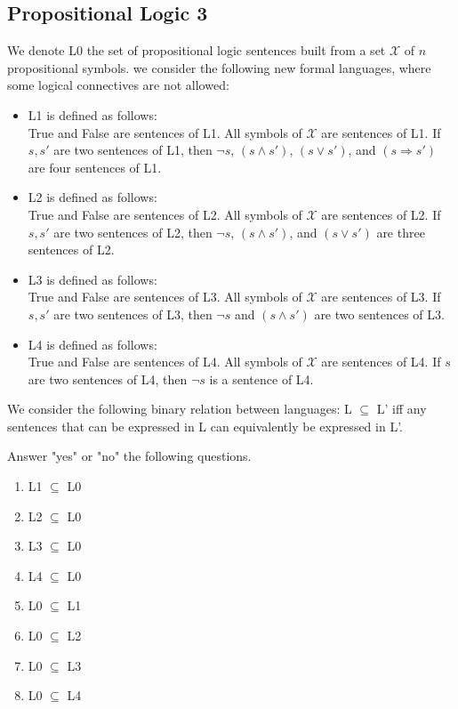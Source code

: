 \documentclass[11pt, answers]{exam}
\begin{document}
%
%
\begin{questions}
\section{Propositional Logic 3}
\question

We denote L0 the set of propositional logic sentences built from a set $\mathcal X$ of $n$ propositional symbols.
we consider the following new formal languages, where some logical connectives are not allowed:
\begin{itemize}
	\item L1 is defined as follows:\\
	True and False are sentences of L1.
	All symbols of $\mathcal X$ are sentences of L1.
	If $s, s'$ are two sentences of L1, then $\neg s$, $(s \wedge s')$, $(s \vee s')$, and $(s \Rightarrow s')$ are four sentences of L1.
	\item L2 is defined as follows:\\
	True and False are sentences of L2.
	All symbols of $\mathcal X$ are sentences of L2.
	If $s, s'$ are two sentences of L2, then $\neg s$, $(s \wedge s')$, and $(s \vee s')$ are three sentences of L2.
	\item L3 is defined as follows:\\
	True and False are sentences of L3.
	All symbols of $\mathcal X$ are sentences of L3.
	If $s, s'$ are two sentences of L3, then $\neg s$ and $(s \wedge s')$ are two sentences of L3.
	\item L4 is defined as follows:\\
	True and False are sentences of L4.
	All symbols of $\mathcal X$ are sentences of L4.
	If $s$ are two sentences of L4, then $\neg s$ is a sentence of L4.
\end{itemize}
We consider the following binary relation between languages: L $\subseteq$ L' iff any sentences that can be expressed in L can equivalently be expressed in L'.

Answer "yes" or "no" the following questions.

\begin{enumerate}
\item L1 $\subseteq$ L0
\item L2 $\subseteq$ L0
\item L3 $\subseteq$ L0
\item L4 $\subseteq$ L0
\item L0 $\subseteq$ L1
\item L0 $\subseteq$ L2
\item L0 $\subseteq$ L3
\item L0 $\subseteq$ L4
\end{enumerate}


\end{questions}
\end{document}
